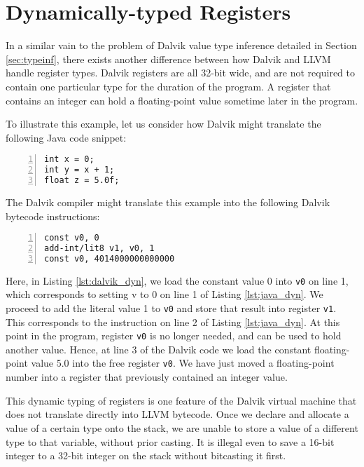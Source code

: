\section{Dynamically-typed Registers}
\label{sec:dyntype}

In a similar vain to the problem of Dalvik value type inference detailed in Section \ref{sec:typeinf}, there exists another difference between how Dalvik and LLVM handle register types. Dalvik registers are all 32-bit wide, and are not required to contain one particular type for the duration of the program. A register that contains an integer can hold a floating-point value sometime later in the program. 

To illustrate this example, let us consider how Dalvik might translate the following Java code snippet:

\lstset{
	language=Java,
	basicstyle=\small,
	stringstyle=\ttfamily
}

\begin{lstlisting}[frame=single, numbers=left, numberstyle=\tiny, caption={Java Dynamic Typing}, label=lst:java_dyn]
int x = 0;
int y = x + 1;
float z = 5.0f;
\end{lstlisting}

The Dalvik compiler might translate this example into the following Dalvik bytecode instructions:


\lstset{
	language=Assembly,
	basicstyle=\small,
	stringstyle=\ttfamily
}

\begin{lstlisting}[frame=single, numbers=left, numberstyle=\tiny, caption={Dalvik bytecode for Listing \ref{lst:java_dyn}}, label=lst:dalvik_dyn]
const v0, 0
add-int/lit8 v1, v0, 1
const v0, 4014000000000000
\end{lstlisting}

Here, in Listing \ref{lst:dalvik_dyn}, we load the constant value 0 into \verb|v0| on line 1, which corresponds to setting v to 0 on line 1 of Listing \ref{lst:java_dyn}. We proceed to add the literal value 1 to \verb|v0| and store that result into register \verb|v1|. This corresponds to the instruction on line 2 of Listing \ref{lst:java_dyn}. At this point in the program, register \verb|v0| is no longer needed, and can be used to hold another value. Hence, at line 3 of the Dalvik code we load the constant floating-point value 5.0 into the free register \verb|v0|. We have just moved a floating-point number into a register that previously contained an integer value.

This dynamic typing of registers is one feature of the Dalvik virtual machine that does not translate directly into LLVM bytecode. Once we declare and allocate a value of a certain type onto the stack, we are unable to store a value of a different type to that variable, without prior casting. It is illegal even to save a 16-bit integer to a 32-bit integer on the stack without bitcasting it first.


